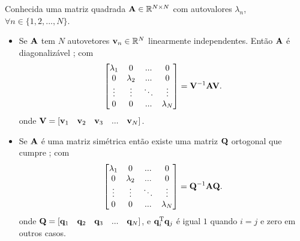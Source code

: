 \begin{theorem}\label{theo:diagonalization1}
Conhecida uma matriz quadrada $\MATRIX{A} \in \mathbb{R}^{N \times N}$ com
autovalores $\lambda_n$, $\forall n \in \{1, 2, ..., N\}$.
\begin{itemize}
\item Se $\MATRIX{A}$ tem $N$  autovetores $\VECTOR{v}_n \in \mathbb{R}^{N}$  linearmente independentes.
Então $\MATRIX{A}$ é diagonalizável \cite[pp. 159]{golub2013matrix};
com
\begin{equation}
\begin{bmatrix}
\lambda_1 & 0         & ...    & 0 \\
0         & \lambda_2 & ...    & 0 \\
\vdots    & \vdots    & \ddots & \vdots \\
0         & 0         & ...    & \lambda_N
\end{bmatrix}
=\MATRIX{V}^{-1}\MATRIX{A}\MATRIX{V}.
\end{equation}
onde $\MATRIX{V}=\left[\VECTOR{v}_1\quad \VECTOR{v}_2\quad \VECTOR{v}_3\quad ...\quad \VECTOR{v}_N\right]$.

\item Se $\MATRIX{A}$ é uma matriz simétrica então
existe uma matriz $\MATRIX{Q}$ ortogonal que cumpre \cite[pp. 67, 440]{golub2013matrix};
com
\begin{equation}
\begin{bmatrix}
\lambda_1 & 0         & ...    & 0 \\
0         & \lambda_2 & ...    & 0 \\
\vdots    & \vdots    & \ddots & \vdots \\
0         & 0         & ...    & \lambda_N
\end{bmatrix}
=\MATRIX{Q}^{-1}\MATRIX{A}\MATRIX{Q}.
\end{equation}
onde $\MATRIX{Q}=\left[\VECTOR{q}_1\quad \VECTOR{q}_2\quad \VECTOR{q}_3\quad ...\quad \VECTOR{q}_N\right]$,
e $\VECTOR{q}_i^{\transpose}\VECTOR{q}_j$ é igual $1$ quando $i=j$ e zero em outros casos.
\end{itemize}
\end{theorem}
